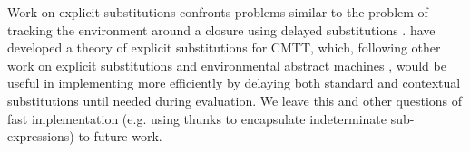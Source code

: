 Work on explicit substitutions confronts problems similar to the problem of tracking the environment around a closure using delayed substitutions \cite{Abadi:1991fr,levy1999explicit,Abadi:1990ys}.  \citet{DBLP:journals/corr/abs-1009-2789} have developed a theory of explicit substitutions for CMTT, which, following other work on explicit substitutions and environmental abstract machines \cite{DBLP:journals/tcs/Curien91}, would be useful in implementing \HazelnutLive more efficiently by delaying both standard and contextual substitutions until needed during evaluation. We leave this and other questions of fast implementation (e.g. using thunks to encapsulate indeterminate sub-expressions) to future work. 







